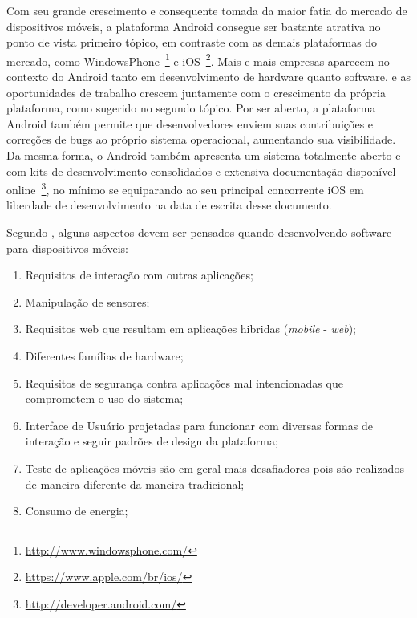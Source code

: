 Com seu grande crescimento e consequente tomada da maior fatia do mercado de dispositivos móveis, a plataforma Android consegue ser bastante atrativa no ponto de vista primeiro tópico, em contraste com as demais plataformas do mercado, como WindowsPhone~\footnote{\url{http://www.windowsphone.com/}} e iOS~\footnote{\url{https://www.apple.com/br/ios/}}. Mais e mais empresas aparecem no contexto do Android tanto em desenvolvimento de hardware quanto software, e as oportunidades de trabalho crescem juntamente com o crescimento da própria plataforma, como sugerido no segundo tópico. Por ser aberto, a plataforma Android também permite que desenvolvedores enviem suas contribuições e correções de bugs ao próprio sistema operacional, aumentando sua visibilidade. Da mesma forma, o Android também apresenta um sistema totalmente aberto e com kits de desenvolvimento consolidados e extensiva documentação disponível online~\footnote{\url{http://developer.android.com/}}, no mínimo se equiparando ao seu principal concorrente iOS em liberdade de desenvolvimento na data de escrita desse documento.

Segundo , alguns aspectos devem ser pensados quando desenvolvendo software para dispositivos móveis:

\begin{enumerate}
\item Requisitos de interação com outras aplicações;
\item Manipulação de sensores;
\item Requisitos web que resultam em aplicações hibridas (\textit{mobile} - \textit{web});
\item Diferentes famílias de hardware;
\item Requisitos de segurança contra aplicações mal intencionadas que comprometem o uso do sistema;
\item Interface de Usuário projetadas para funcionar com diversas formas de interação e seguir padrões de design da plataforma;
\item Teste de aplicações móveis são em geral mais desafiadores pois são realizados de maneira diferente da maneira tradicional;
\item Consumo de energia;
\end{enumerate}

